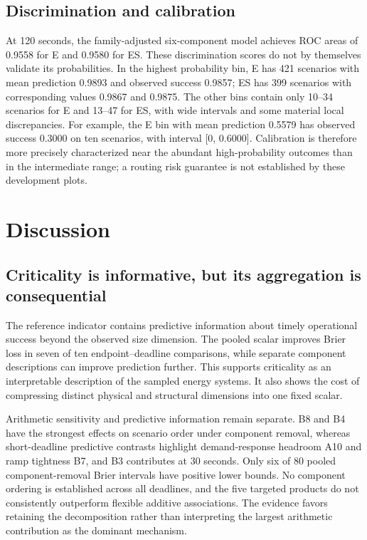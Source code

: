 \subsection{Discrimination and calibration}
At 120 seconds, the family-adjusted six-component model achieves ROC
areas of 0.9558 for E and 0.9580 for ES. These discrimination scores do
not by themselves validate its probabilities. In the highest probability
bin, E has 421 scenarios with mean prediction 0.9893 and observed success
0.9857; ES has 399 scenarios with corresponding values 0.9867 and 0.9875.
The other bins contain only 10--34 scenarios for E and 13--47 for ES,
with wide intervals and some material local discrepancies. For example,
the E bin with mean prediction 0.5579 has observed success 0.3000
on ten scenarios, with interval [0, 0.6000].
Calibration is therefore more precisely characterized near the abundant
high-probability outcomes than in the intermediate range; a routing risk
guarantee is not established by these development plots.




\section{Discussion}
\subsection{Criticality is informative, but its aggregation is consequential}
The reference indicator contains predictive information about timely
operational success beyond the observed size dimension. The pooled scalar
improves Brier loss in seven of ten endpoint--deadline comparisons, while
separate component descriptions can improve prediction further. This
supports criticality as an interpretable description of the sampled energy
systems. It also shows the cost of compressing distinct physical and
structural dimensions into one fixed scalar.

Arithmetic sensitivity and predictive information remain separate. B8 and
B4 have the strongest effects on scenario order under component removal,
whereas short-deadline predictive contrasts highlight demand-response
headroom A10 and ramp tightness B7, and B3 contributes at 30 seconds. Only
six of 80 pooled component-removal Brier intervals have positive lower bounds.
No component ordering is established across all deadlines, and the five
targeted products do not consistently outperform flexible additive
associations. The evidence favors retaining the decomposition rather than
interpreting the largest arithmetic contribution as the dominant mechanism.

